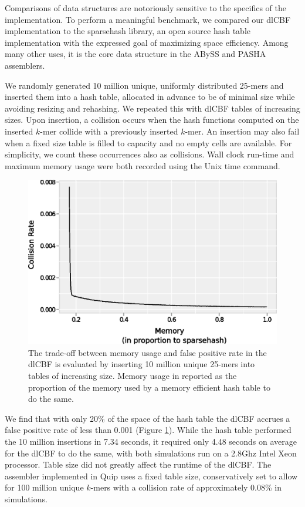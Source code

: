 \documentclass[a4,center,fleqn]{NAR}
\begin{document}
Comparisons of data structures are notoriously sensitive to the specifics of
the implementation. To perform a meaningful benchmark, we compared our dlCBF
implementation to the sparsehash library, an open source hash table
implementation with the expressed goal of maximizing space efficiency. Among
many other uses, it is the core data structure in the ABySS
\citep{Simpson2011} and PASHA \citep{Liu2011} assemblers.

We randomly generated 10 million unique, uniformly distributed 25-mers and
inserted them into a hash table, allocated in advance to be of minimal size
while avoiding resizing and rehashing. We repeated this with dlCBF tables of
increasing sizes. Upon insertion, a collision occurs when the hash functions
computed on the inserted $k$-mer collide with a previously inserted $k$-mer.
An insertion may also fail when a fixed size table is filled to capacity and
no empty cells are available. For simplicity, we count these occurrences also
as collisions. Wall clock run-time and maximum memory usage were both recorded
using the Unix time command.

\begin{figure}[h]
\centerline{\includegraphics[width=\columnwidth]{dlcbf.eps}}
\caption{
The trade-off between memory usage and false positive rate in the dlCBF is
evaluated by inserting 10 million unique 25-mers into tables of increasing
size. Memory usage in reported as the proportion of the memory used by a
memory efficient hash table to do the same.
}
\label{fig:dlcbf_bench}
\end{figure}

We find that with only 20\% of the space of the hash table the dlCBF accrues a
false positive rate of less than 0.001 (Figure \ref{fig:dlcbf_bench}). While
the hash table performed the 10 million insertions in 7.34 seconds, it
required only 4.48 seconds on average for the dlCBF to do the same, with both
simulations run on a 2.8Ghz Intel Xeon processor. Table size did not greatly
affect the runtime of the dlCBF. The assembler implemented in Quip uses a
fixed table size, conservatively set to allow for 100 million unique $k$-mers
with a collision rate of approximately 0.08\% in simulations.
\end{document}
